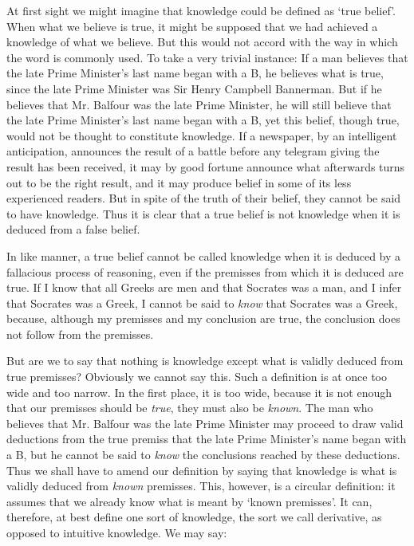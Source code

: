 \documentclass[oneside,letterpaper,12pt]{book}
\begin{document}
At first sight we might imagine that knowledge could be defined as
`true belief'. When what we believe is
true, it might be supposed that we had achieved a knowledge of what we
believe. But this would not accord with the way in which the word is
commonly used. \label{luck} To take a very trivial instance: If a man believes that
the late Prime Minister's last name began with a B,\label{Balfour1} he
believes what is true, since the late Prime Minister was Sir Henry
Campbell Bannerman. But if he believes that Mr. Balfour was the late
Prime Minister, he will still believe that the late Prime
Minister's last name began with a B, yet this belief,
though true, would not be thought to constitute knowledge. If a
newspaper, by an intelligent anticipation, announces the result of a
battle before any telegram giving the result has been received, it may
by good fortune announce what afterwards turns out to be the right
result, and it may produce belief in some of its less experienced
readers. But in spite of the truth of their belief, they cannot be said
to have knowledge. Thus it is clear that a true belief is not knowledge
when it is deduced from a false belief.

In like manner, a true belief cannot be called knowledge when it is
deduced by a fallacious process of reasoning, even if the premisses from
which it is deduced are true. \label{fallacious} If I know that all Greeks are men and that
Socrates was a man, and I infer that Socrates was a Greek, I cannot be
said to \emph{know} that Socrates was a Greek, because, although my
premisses and my conclusion are true, the conclusion does not follow
from the premisses.

But are we to say that nothing is knowledge except what is validly
deduced from true premisses? Obviously we cannot say this. Such a
definition is at once too wide and too narrow. In the first place, it is
too wide, because it is not enough that our premisses should be
\emph{true}, they must also be \emph{known}. \label{premises} The man who believes that
Mr. Balfour was the late Prime Minister may proceed to draw valid
deductions from the true premiss that the late Prime
Minister's name began with a B,\label{Balfour2} but he cannot be said to
\emph{know} the conclusions reached by these deductions. Thus we shall
have to amend our definition by saying that knowledge is what is validly
deduced from \emph{known} premisses. This, however, is a circular
definition: it assumes that we already know what is meant by
`known premisses'. It can, therefore, at
best define one sort of knowledge, the sort we call derivative, as
opposed to intuitive knowledge. We may say:
\end{document}

